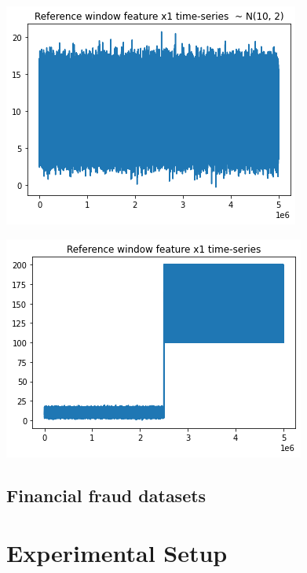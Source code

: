 \begin{minipage}{.5\textwidth}
  \centering
  \includegraphics[width=.9\linewidth]{figures/01-reference.png}
  \label{fig:rd01}
\end{minipage}%
\begin{minipage}{.5\textwidth}
  \centering
  \includegraphics[width=.9\linewidth]{figures/01-target.png}
  \label{fig:td01}
\end{minipage}


\subsection{Financial fraud datasets}

\section{Experimental Setup}
